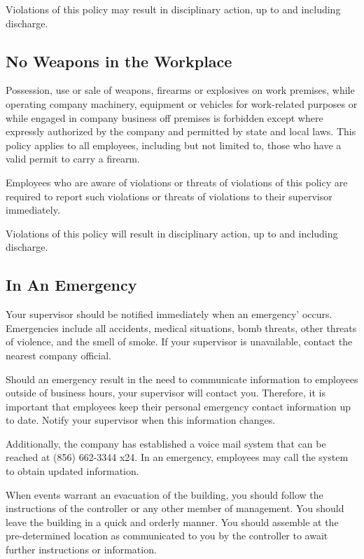 Violations of this policy may result in disciplinary action, up to and including discharge.

\subsection{No Weapons in the Workplace}

Possession, use or sale of weapons, firearms or explosives on work premises, while operating company machinery, equipment or vehicles for work-related purposes or while engaged in company business off premises is forbidden except where expressly authorized by the company and permitted by state and local laws. This policy applies to all employees, including but not limited to, those who have a valid permit to carry a firearm.

Employees who are aware of violations or threats of violations of this policy are required to report such violations or threats of violations to their supervisor immediately.

Violations of this policy will result in disciplinary action, up to and including discharge.

\subsection{In An Emergency}

Your supervisor should be notified immediately when an emergency’ occurs. Emergencies include all accidents, medical situations, bomb threats, other threats of violence, and the smell of smoke. If your supervisor is unavailable, contact the nearest company official.

Should an emergency result in the need to communicate information to employees outside of business hours, your supervisor will contact you. Therefore, it is important that employees keep their personal emergency contact information up to date. Notify your supervisor when this information changes.

Additionally, the company has established a voice mail system that can be reached at (856) 662-3344 x24. In an emergency, employees may call the system to obtain updated information.

When events warrant an evacuation of the building, you should follow the instructions of the controller or any other member of management. You should leave the building in a quick and orderly manner. You should assemble at the pre-determined location as communicated to you by the controller to await further instructions or information.

